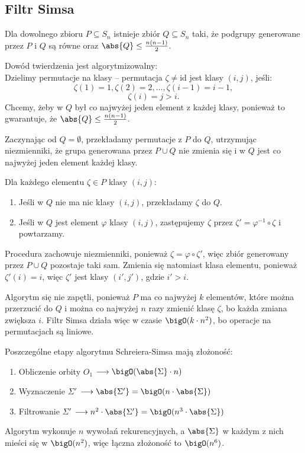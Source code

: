 \newpage
\subsection{Filtr Simsa}
\begin{theorem}
    Dla dowolnego zbioru \( P \subseteq S_n \) istnieje zbiór \( Q \subseteq S_n \) taki, że podgrupy generowane przez \(P\) i \(Q\) są równe oraz \( \abs{Q} \leq \frac{n(n-1)}{2} \).
\end{theorem}
Dowód twierdzenia jest algorytmizowalny: \\
Dzielimy permutacje na klasy -- permutacja \(\zeta \neq \text{id}\) jest klasy \((i, j)\), jeśli:
\[
    \zeta(1) = 1, \zeta(2) = 2, \ldots, \zeta(i - 1) = i - 1,
\]
\[
    \zeta(i) = j > i.
\]
Chcemy, żeby w \( Q \) był co najwyżej jeden element z każdej klasy, ponieważ to gwarantuje, że \( \abs{Q} \leq \frac{n(n-1)}{2} \).

Zaczynając od \(Q = \emptyset\), przekładamy permutacje z \(P\) do \(Q\), utrzymując niezmienniki, że grupa generowana przez \( P \cup Q \) nie zmienia się i w \( Q \) jest co najwyżej jeden element każdej klasy.

Dla każdego elementu \(\zeta \in P\) klasy \((i, j)\):
\begin{enumerate}
    \item Jeśli w \(Q\) nie ma nic klasy \((i, j)\), przekładamy \(\zeta\) do \(Q\).
    \item Jeśli w \(Q\) jest element \(\varphi\) klasy \((i, j)\), zastępujemy \(\zeta\) przez \(\zeta' = \varphi^{-1} \circ \zeta\) i powtarzamy.
\end{enumerate}
Procedura zachowuje niezmienniki, ponieważ \(\zeta = \varphi \circ \zeta'\), więc zbiór generowany przez \(P \cup Q\) pozostaje taki sam.
Zmienia się natomiast klasa elementu, ponieważ \(\zeta'(i) = i\), więc \(\zeta'\) jest klasy \((i', j')\), gdzie \(i' > i\).

Algorytm się nie zapętli, ponieważ \( P \) ma co najwyżej \(k\) elementów, które można przerzucić do \(Q\) i można co najwyżej \( n \) razy zmienić klasę \( \zeta \), bo każda zmiana zwiększa \( i \).
Filtr Simsa działa więc w czasie \(\bigO(k \cdot n^2)\), bo operacje na permutacjach są liniowe.

Poszczególne etapy algorytmu Schreiera-Simsa mają złożoność:
\begin{enumerate}
    \item Obliczenie orbity \(O_1\) \( \longrightarrow \bigO(\abs{\Sigma} \cdot n) \)
    \item Wyznaczenie \(\Sigma'\) \( \longrightarrow \abs{\Sigma'} = \bigO(n \cdot \abs{\Sigma}) \)
    \item Filtrowanie \(\Sigma'\) \( \longrightarrow n^2 \cdot \abs{\Sigma'} = \bigO(n^3 \cdot \abs{\Sigma}) \)
\end{enumerate}
Algorytm wykonuje \( n \) wywołań rekurencyjnych, a \( \abs{\Sigma} \) w każdym z nich mieści się w \( \bigO(n^2) \), więc łączna złożoność to \( \bigO(n^6) \).